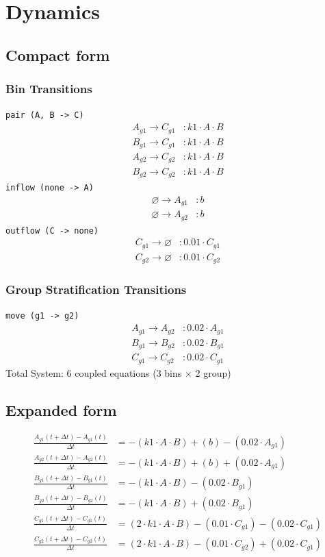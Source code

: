 \documentclass{article}
\begin{document}
\section*{Dynamics}
\subsection*{Compact form}
\subsubsection*{Bin Transitions}
\noindent\texttt{pair (A, B -\textgreater{} C)}
\begin{align*}
A_{g1} \to C_{g1} &: k1 \cdot A \cdot B \\
B_{g1} \to C_{g1} &: k1 \cdot A \cdot B \\
A_{g2} \to C_{g2} &: k1 \cdot A \cdot B \\
B_{g2} \to C_{g2} &: k1 \cdot A \cdot B
\end{align*}
\noindent\texttt{inflow (none -\textgreater{} A)}
\begin{align*}
\varnothing \to A_{g1} &: b \\
\varnothing \to A_{g2} &: b
\end{align*}
\noindent\texttt{outflow (C -\textgreater{} none)}
\begin{align*}
C_{g1} \to \varnothing &: 0.01 \cdot C_{g1} \\
C_{g2} \to \varnothing &: 0.01 \cdot C_{g2}
\end{align*}
\subsubsection*{Group Stratification Transitions}
\noindent\texttt{move (g1 -\textgreater{} g2)}
\begin{align*}
A_{g1} \to A_{g2} &: 0.02 \cdot A_{g1} \\
B_{g1} \to B_{g2} &: 0.02 \cdot B_{g1} \\
C_{g1} \to C_{g2} &: 0.02 \cdot C_{g1}
\end{align*}
Total System: 6 coupled equations (3 bins $\times$ 2 group)

\subsection*{Expanded form}
\begin{align*}
\frac{A_{g1}(t+\Delta t) - A_{g1}(t)}{\Delta t} &= - (k1 \cdot A \cdot B) + (b) - (0.02 \cdot A_{g1}) \\
\frac{A_{g2}(t+\Delta t) - A_{g2}(t)}{\Delta t} &= - (k1 \cdot A \cdot B) + (b) + (0.02 \cdot A_{g1}) \\
\frac{B_{g1}(t+\Delta t) - B_{g1}(t)}{\Delta t} &= - (k1 \cdot A \cdot B) - (0.02 \cdot B_{g1}) \\
\frac{B_{g2}(t+\Delta t) - B_{g2}(t)}{\Delta t} &= - (k1 \cdot A \cdot B) + (0.02 \cdot B_{g1}) \\
\frac{C_{g1}(t+\Delta t) - C_{g1}(t)}{\Delta t} &= (2 \cdot k1 \cdot A \cdot B) - (0.01 \cdot C_{g1}) - (0.02 \cdot C_{g1}) \\
\frac{C_{g2}(t+\Delta t) - C_{g2}(t)}{\Delta t} &= (2 \cdot k1 \cdot A \cdot B) - (0.01 \cdot C_{g2}) + (0.02 \cdot C_{g1})
\end{align*}
\end{document}
